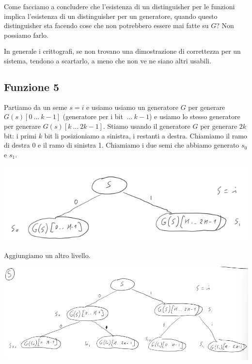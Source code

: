 Come facciamo a concludere che l'esistenza di un distinguisher per le funzioni implica l'esistenza di un distinguisher per un generatore, quando questo distinguisher sta facendo cose che non potrebbero essere mai fatte su $G$? Non possiamo farlo.

In generale i crittografi, se non trovano una dimostrazione di correttezza per un sistema, tendono a scartarlo, a meno che non ve ne siano altri usabili. 

\subsection{Funzione 5}
Partiamo da un seme $s = i$ e usiamo usiamo un generatore $G$ per generare $G(s)[0\ ...\ k-1]$ (generatore per i bit $\ ...\ k-1$) e usiamo lo stesso generatore per generare $G(s)[k \ ...\ 2k-1]$. Stiamo usando il generatore $G$ per generare $2k$ bit: i primi $k$ bit li posizioniamo a sinistra, i restanti a destra. Chiamiamo il ramo di destra 0 e il ramo di sinistra 1. Chiamiamo i due semi che abbiamo generato $s_0$ e $s_1$.
\begin{center}
    \includegraphics[width=1\textwidth]{images/fun5-1.png}
\end{center}

\noindent Aggiungiamo un altro livello. 
\begin{center}
    \includegraphics[width=1\textwidth]{images/fun5-2.png}
\end{center}

